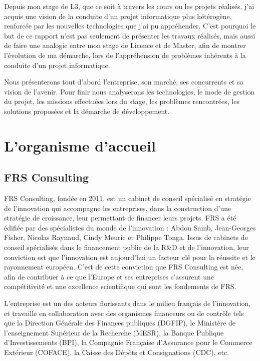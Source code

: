 \documentclass[french]{article}
\begin{document}
{Depuis mon stage de L3, que ce soit à travers les cours ou les projets réalisés, j'ai acquis une vision de la conduite d'un projet informatique plus hétérogène, renforcée par les nouvelles technologies que j'ai pu appréhender.
\newline{}
C'est pourquoi le but de ce rapport n'est pas seulement de présenter les travaux réalisés, mais aussi de faire une analogie entre mon stage de Licence et de Master, afin de montrer l'évolution de ma démarche, lors de l'appréhension de problèmes inhérents à la conduite d'un projet informatique.

Nous présenterons tout d'abord l'entreprise, son marché, ses concurrents et sa vision de l'avenir.
\newline{}
Pour finir nous analyserons les technologies, le mode de gestion du projet, les missions effectuées lors du stage, les problèmes rencontrées, les solutions proposées et la démarche de développement.

\section{L'organisme d'accueil}

\subsection{FRS Consulting}

FRS Consulting, fondée en 2011, est un cabinet de conseil spécialisé en stratégie de l’innovation qui accompagne les entreprises, dans la construction d'une stratégie de croissance, leur permettant de financer leurs projets. FRS a été édifiée par des spécialistes du monde de l'innovation : Abdou Samb, Jean-Georges Fisher, Nicolas Raynaud, Cindy Meuric et Philippe Tonga. Issus de cabinets de conseil spécialisés dans le financement public de la R\&D et de l'innovation, leur conviction est que l'innovation est aujourd'hui un facteur clé pour la réussite et le rayonnement européen.
\newline{}
C'est de cette conviction que FRS Consulting est née, afin de contribuer à ce que l'Europe et ses entreprises s'assurent une compétitivité et une excellence scientifique qui sont les fondements de FRS.

L'entreprise est un des acteurs florissants dans le milieu français de l’innovation, et travaille en collaboration avec des organismes financeurs ou de contrôle tels que la Direction Générale des Finances publiques (DGFIP), le Ministère de l’enseignement Supérieur de la Recherche (MESR), la Banque Publique d’Investissements (BPI), la Compagnie Française d’Assurance pour le Commerce Extérieur (COFACE), la Caisse des Dépôts et Consignations (CDC), etc.

}
\end{document}
